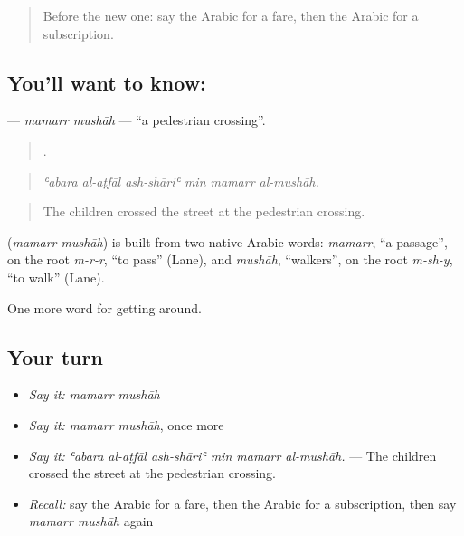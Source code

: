 \label{lesson:AR-C435-mamarr-mushah}



\begin{quote}
Before the new one: say the Arabic for a fare, then the Arabic for a subscription.
\end{quote}

\subsection*{You'll want to know:  }
\textbf{ } — \emph{mamarr mushāh} — \textquotedblleft{}a pedestrian crossing\textquotedblright{}.

\begin{quote}
     .
\end{quote}

\begin{quote}
\emph{ʿabara al-aṭfāl ash-shāriʿ min mamarr al-mushāh.}
\end{quote}

\begin{quote}
The children crossed the street at the pedestrian crossing.
\end{quote}

\begin{cousinweb}
\textbf{ } (\emph{mamarr mushāh}) is built from two native Arabic words: \emph{mamarr}, \textquotedblleft{}a passage\textquotedblright{}, on the root \emph{m-r-r}, \textquotedblleft{}to pass\textquotedblright{} (Lane), and \emph{mushāh}, \textquotedblleft{}walkers\textquotedblright{}, on the root \emph{m-sh-y}, \textquotedblleft{}to walk\textquotedblright{} (Lane).
\end{cousinweb}

\begin{grammarlens}[title={What you've built}]
One more word for getting around.
\end{grammarlens}

\subsection*{Your turn}
\begin{itemize}
\raggedright
  \item \emph{Say it:} \emph{mamarr mushāh}
  \item \emph{Say it:} \emph{mamarr mushāh}, once more
  \item \emph{Say it:} \emph{ʿabara al-aṭfāl ash-shāriʿ min mamarr al-mushāh.} — The children crossed the street at the pedestrian crossing.
  \item \emph{Recall:} say the Arabic for a fare, then the Arabic for a subscription, then say \emph{mamarr mushāh} again
\end{itemize}

